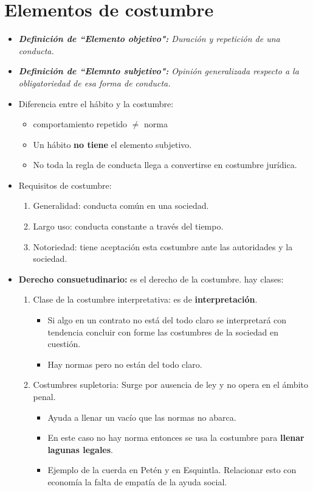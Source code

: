 \section{Elementos de costumbre}
\begin{itemize}
    \item \emph{\textbf{Definición de ``Elemento objetivo":} Duración y repetición de una conducta.}
    \item \emph{\textbf{Definición de ``Elemnto subjetivo":} Opinión generalizada respecto a la obligatoriedad de esa forma de conducta.}
    \item Diferencia entre el hábito y la costumbre:
    \begin{itemize}
        \item comportamiento repetido $\neq$ norma
        \item Un hábito \textbf{no tiene }el elemento subjetivo.
        \item No toda la regla de conducta llega a convertirse en costumbre jurídica.
    \end{itemize}
    
    \item Requisitos de costumbre:
    \begin{enumerate}
        \item Generalidad: conducta común en una sociedad.
        \item Largo uso: conducta constante a través del tiempo.
        \item Notoriedad: tiene aceptación esta costumbre ante las autoridades y la sociedad.
    \end{enumerate}
    
    \item \textbf{Derecho consuetudinario:} es el derecho de la costumbre. hay clases:
    \begin{enumerate}
        \item Clase de la costumbre interpretativa: es de \textbf{interpretación}.
            \begin{itemize}
                \item Si algo en un contrato no está del todo claro se interpretará con tendencia concluir con forme las costumbres de la sociedad en cuestión.
                \item Hay normas pero no están del todo claro.
            \end{itemize}
        
        \item Costumbres supletoria: Surge por ausencia de ley y no opera en el ámbito penal.
            \begin{itemize}
                \item Ayuda a llenar un vacío que las normas no abarca.
                \item En este caso no hay norma entonces se usa la costumbre para \textbf{llenar lagunas legales}.
                \item Ejemplo de la cuerda en Petén y en Esquintla. Relacionar esto con economía la falta de empatía de la ayuda social.
            \end{itemize} %
        

\end{enumerate}
\end{itemize}
